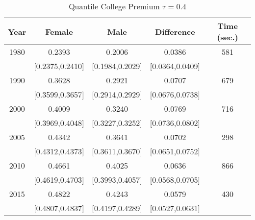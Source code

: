 \begin{table}[ht]
\centering
\begin{tabular}{ccccc}
  \hline
Year & Female & Male & Difference & Time (sec.) \\ 
  \hline
1980 & 0.2393 & 0.2006 & 0.0386 & 581 \\ 
   & [0.2375,0.2410] & [0.1984,0.2029] & [0.0364,0.0409] &  \\ 
  1990 & 0.3628 & 0.2921 & 0.0707 & 679 \\ 
   & [0.3599,0.3657] & [0.2914,0.2929] & [0.0676,0.0738] &  \\ 
  2000 & 0.4009 & 0.3240 & 0.0769 & 716 \\ 
   & [0.3969,0.4048] & [0.3227,0.3252] & [0.0736,0.0802] &  \\ 
  2005 & 0.4342 & 0.3641 & 0.0702 & 298 \\ 
   & [0.4312,0.4373] & [0.3611,0.3670] & [0.0651,0.0752] &  \\ 
  2010 & 0.4661 & 0.4025 & 0.0636 & 866 \\ 
   & [0.4619,0.4703] & [0.3993,0.4057] & [0.0568,0.0705] &  \\ 
  2015 & 0.4822 & 0.4243 & 0.0579 & 430 \\ 
   & [0.4807,0.4837] & [0.4197,0.4289] & [0.0527,0.0631] &  \\ 
   \hline
\end{tabular}
\caption{Quantile College Premium $\tau=0.4$} 
\end{table}
